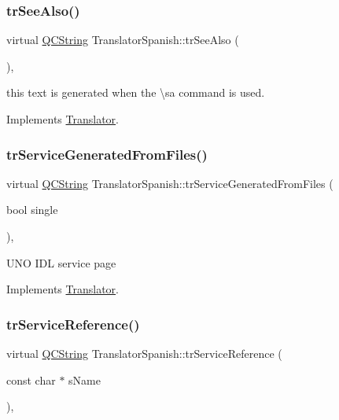 \subsubsection{\texorpdfstring{trSeeAlso()}{trSeeAlso()}}
{\footnotesize\ttfamily virtual \mbox{\hyperlink{class_q_c_string}{Q\+C\+String}} Translator\+Spanish\+::tr\+See\+Also (\begin{DoxyParamCaption}{ }\end{DoxyParamCaption})\hspace{0.3cm}{\ttfamily [inline]}, {\ttfamily [virtual]}}

this text is generated when the \textbackslash{}sa command is used. 

Implements \mbox{\hyperlink{class_translator}{Translator}}.

\mbox{\label{class_translator_spanish_a6106aff44f7f1eb6263703ae3268c188}} 
\subsubsection{\texorpdfstring{trServiceGeneratedFromFiles()}{trServiceGeneratedFromFiles()}}
{\footnotesize\ttfamily virtual \mbox{\hyperlink{class_q_c_string}{Q\+C\+String}} Translator\+Spanish\+::tr\+Service\+Generated\+From\+Files (\begin{DoxyParamCaption}\item[{bool}]{single }\end{DoxyParamCaption})\hspace{0.3cm}{\ttfamily [inline]}, {\ttfamily [virtual]}}

U\+NO I\+DL service page 

Implements \mbox{\hyperlink{class_translator}{Translator}}.

\mbox{\label{class_translator_spanish_a64711bb59017c8079509170923f25d0d}} 
\subsubsection{\texorpdfstring{trServiceReference()}{trServiceReference()}}
{\footnotesize\ttfamily virtual \mbox{\hyperlink{class_q_c_string}{Q\+C\+String}} Translator\+Spanish\+::tr\+Service\+Reference (\begin{DoxyParamCaption}\item[{const char $\ast$}]{s\+Name }\end{DoxyParamCaption})\hspace{0.3cm}{\ttfamily [inline]}, {\ttfamily [virtual]}}

